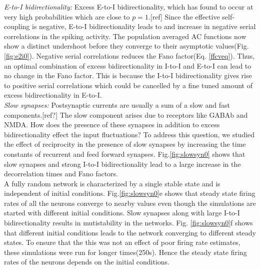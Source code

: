 \emph{E-to-I bidirectionality:} Excess E-to-I bidirectionality, which has found to occur at very high probabilities which are close to $p=1$.[ref] %
Since the effective self-coupling is negative, E-to-I bidirectionality leads to and increase in negative serial correlations in the spiking activity. The population averaged AC functions now show a distinct undershoot before they converge to their asymptotic values(Fig. \ref{fig:e2i0}). Negative serial correlations reduces the Fano factor(Eq. \ref{ffcveq}). Thus, an optimal combination of excess bidirectionality in I-to-I and E-to-I can lead to no change in the Fano factor. This is because the I-to-I bidirectionality gives rise to positive serial correlations which could be cancelled by a fine tuned amount of excess bidirectionality in E-to-I. \\
\emph{Slow synapses:} Postsynaptic currents are usually a sum of a slow and fast components.[ref?] The slow component arises due to receptors like GABAb and NMDA. How does the presence of these synapses in addition to excess bidirectionality effect the input fluctuations? To address this question, we studied the effect of reciprocity in the presence of slow synapses by increasing the time constants of recurrent and feed forward synapses. Fig.\ref{fig:slowsyn0} shows that slow synapses and strong I-to-I bidirectionality lead to a large increase in the decorrelation times and Fano factors.\\  A fully random network is characterized by a single stable state and is independent of initial conditions. Fig.\ref{fig:slowsyn0}e shows that steady state firing rates of all the neurons converge to nearby values even though the simulations are started with different initial conditions. Slow synapses along with large I-to-I bidirectionality results in mutistability in the networks. Fig. \ref{fig:slowsyn0}f shows that different initial conditions leads to the network converging to different steady states. To ensure that the this was not an effect of poor firing rate estimates, these simulations were run for longer times(250s). Hence the steady state firing rates of the neurons depends on the initial conditions. \\

